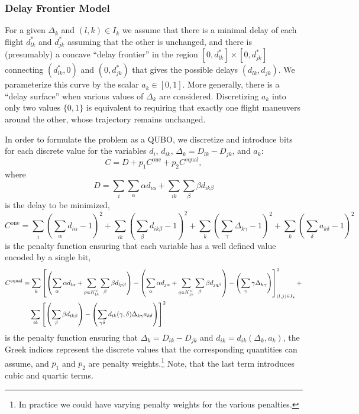 \documentclass{article}
\begin{document}
\subsubsection{Delay Frontier Model}
For a given $\Delta_{k}$ and $(l, k) \in I_k$ we assume that there is a minimal delay of each flight $d_{lk}^*$ and $d_{jk}^*$ assuming that the other is unchanged, and there is (presumably) a concave ``delay frontier'' in the region $[0, d_{lk}^*] \times [0, d_{jk}^*]$ connecting $(d_{lk}^*, 0)$ and $(0, d_{jk}^*)$ that gives the possible delays $(d_{lk}, d_{jk})$. 
We parameterize this curve by the scalar $a_{k} \in [0, 1]$.
More generally, there is a ``delay surface'' when various values of $\Delta_{k}$ are considered.
Discretizing $a_k$ into only two values $\{0, 1\}$ is equivalent to requiring that exactly one flight maneuvers around the other, whose trajectory remains unchanged.

In order to formulate the problem as a QUBO, we discretize and introduce bits for each discrete value for the variables $d_i$, $d_{ik}$, $\Delta_k = D_{lk} - D_{jk}$, and $a_k$:
\begin{equation*}
    C = D + p_1 C^{\mathrm{one}} + p_2 C^{\mathrm{equal}},
\end{equation*}
where 
\begin{equation*}
D = 
\sum_{i} \sum_{\alpha} \alpha d_{i\alpha}
+
\sum_{ik} \sum_{\beta} \beta d_{ik\beta}
\end{equation*}
is the delay to be minimized,
\begin{equation*}
C^{\mathrm{one}}
=
\sum_i \left(\sum_{\alpha} d_{i\alpha}- 1 \right)^2 
+
\sum_{ik} \left(\sum_{\beta} d_{ik\beta} - 1\right)^2
+
\sum_{k} \left(\sum_{\gamma} \Delta_{k\gamma} - 1\right)^2
+
\sum_{k} \left(\sum_{\delta} a_{k\delta}- 1\right)^2
\end{equation*}
is the penalty function ensuring that each variable has a well defined value encoded by a single bit,
\begin{align*}
C^{\mathrm{equal}}
&=
\sum_{k} \left[
\left(\sum_{\alpha} \alpha d_{l\alpha} + \sum_{p \in K^<_{lk}} \sum_{\beta} \beta d_{lp\beta}\right)
-
\left(\sum_{\alpha} \alpha d_{j\alpha} + \sum_{q \in K^<_{jk}} \sum_{\beta} \beta d_{jq\beta}\right)
-
\left(\sum_{\gamma} \gamma \Delta_{k\gamma}\right)\right]_{(l, j) \in I_k }^2
+ \\
&\hphantom{=,}
\sum_{ik} \left[
    \left(\sum_{\beta} \beta d_{ik\beta}\right) - 
\left(\sum_{\gamma \delta} d_{ik} (\gamma, \delta) \Delta_{k\gamma} a_{k\delta}\right)\right]^2
\end{align*}
is the penalty function ensuring that $\Delta_k = D_{ik} - D_{jk}$ and $d_{ik} = d_{ik}(\Delta_k, a_k)$, 
the Greek indices represent the discrete values that the corresponding quantities can assume, and $p_1$ and $p_2$ are penalty weights.\footnote{In practice we could have varying penalty weights for the various penalties.}
Note, that the last term introduces cubic and quartic terms.
\end{document}
